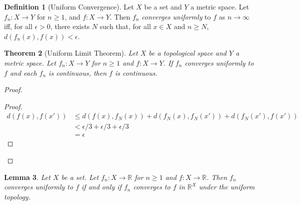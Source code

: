 \documentclass{report}
\let\qed\relax
\newtheorem{lm}{Lemma}[section]
\newtheorem{thm}[lm]{Theorem}
\theoremstyle{definition}
\newtheorem{df}[lm]{Definition}
\begin{document}
  \begin{df}[Uniform Convergence]
    Let $X$ be a set and $Y$ a metric space. Let $f_n : X \rightarrow Y$ for $n
    \geq 1$, and $f : X \rightarrow Y$. Then $f_n$ \emph{converges uniformly}
    to
    $f$ as $n \rightarrow \infty$ iff, for all $\epsilon > 0$, there exists $N$
    such that, for all $x \in X$ and $n \geq N$, $d(f_n(x), f(x)) < \epsilon$.
  \end{df}

  \begin{thm}[Uniform Limit Theorem]
    Let $X$ be a topological space and $Y$ a metric space. Let $f_n : X
    \rightarrow Y$ for $n \geq 1$ and $f : X \rightarrow Y$. If $f_n$ converges
    uniformly to $f$ and each $f_n$ is continuous, then $f$ is continuous.
  \end{thm}

  \begin{proof}
    \pf
    \begin{proof}
      \pf
      \begin{align*}
        d(f(x), f(x')) & \leq d(f(x), f_N(x)) + d(f_N(x), f_N(x')) + d(f_N(x'),
        f(x')) \\
        & < \epsilon / 3 + \epsilon / 3 + \epsilon / 3 \\
        & = \epsilon
      \end{align*}
    \end{proof}
    \qed
  \end{proof}

  \begin{lm}
    Let $X$ be a set. Let $f_n : X \rightarrow \mathbb{R}$ for $n \geq 1$ and
    $f : X \rightarrow \mathbb{R}$. Then $f_n$ converges uniformly to $f$ if
    and only if $f_n$ converges to $f$ in $\mathbb{R}^X$ under the uniform
    topology.
  \end{lm}
\end{document}
